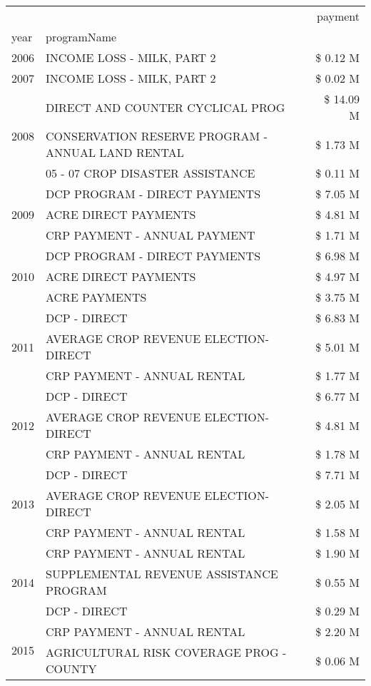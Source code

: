 \begin{tabular}{llr}
\toprule
 &  & payment \\
year & programName &  \\
\midrule
2006 & INCOME LOSS - MILK, PART 2 & \$ 0.12 M \\
\cline{1-3}
2007 & INCOME LOSS - MILK, PART 2 & \$ 0.02 M \\
\cline{1-3}
\multirow[t]{3}{*}{2008} & DIRECT AND COUNTER CYCLICAL PROG & \$ 14.09 M \\
 & CONSERVATION RESERVE PROGRAM - ANNUAL LAND RENTAL & \$ 1.73 M \\
 & 05 - 07 CROP DISASTER ASSISTANCE & \$ 0.11 M \\
\cline{1-3}
\multirow[t]{3}{*}{2009} & DCP PROGRAM - DIRECT PAYMENTS & \$ 7.05 M \\
 & ACRE DIRECT PAYMENTS & \$ 4.81 M \\
 & CRP PAYMENT - ANNUAL PAYMENT & \$ 1.71 M \\
\cline{1-3}
\multirow[t]{3}{*}{2010} & DCP PROGRAM - DIRECT PAYMENTS & \$ 6.98 M \\
 & ACRE DIRECT PAYMENTS & \$ 4.97 M \\
 & ACRE PAYMENTS & \$ 3.75 M \\
\cline{1-3}
\multirow[t]{3}{*}{2011} & DCP - DIRECT & \$ 6.83 M \\
 & AVERAGE CROP REVENUE ELECTION-DIRECT & \$ 5.01 M \\
 & CRP PAYMENT - ANNUAL RENTAL & \$ 1.77 M \\
\cline{1-3}
\multirow[t]{3}{*}{2012} & DCP - DIRECT & \$ 6.77 M \\
 & AVERAGE CROP REVENUE ELECTION-DIRECT & \$ 4.81 M \\
 & CRP PAYMENT - ANNUAL RENTAL & \$ 1.78 M \\
\cline{1-3}
\multirow[t]{3}{*}{2013} & DCP - DIRECT & \$ 7.71 M \\
 & AVERAGE CROP REVENUE ELECTION-DIRECT & \$ 2.05 M \\
 & CRP PAYMENT - ANNUAL RENTAL & \$ 1.58 M \\
\cline{1-3}
\multirow[t]{3}{*}{2014} & CRP PAYMENT - ANNUAL RENTAL & \$ 1.90 M \\
 & SUPPLEMENTAL REVENUE ASSISTANCE PROGRAM & \$ 0.55 M \\
 & DCP - DIRECT & \$ 0.29 M \\
\cline{1-3}
\multirow[t]{3}{*}{2015} & CRP PAYMENT - ANNUAL RENTAL & \$ 2.20 M \\
 & AGRICULTURAL RISK COVERAGE PROG - COUNTY & \$ 0.06 M \\

\end{tabular}

